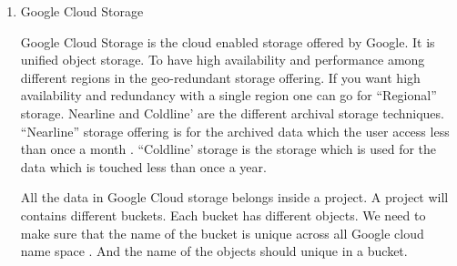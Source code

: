 \begin{enumerate}
\item {} 
Google Cloud Storage

Google Cloud Storage is the cloud enabled storage offered by
Google. \label{\detokenize{i524/technologies:id556}}{\hyperref[\detokenize{i524/technologies:www-google-cloud-storage}]{\sphinxcrossref{{[}476{]}}}} It is unified object
storage. To have high availability and performance among
different regions in the geo-redundant storage offering. If you
want high availability and redundancy with a single region one
can go for “Regional” storage. Nearline and Coldline’ are the
different archival storage techniques. “Nearline” storage
offering is for the archived data which the user access less than
once a month . “Coldline’ storage is the storage which is used
for the data which is touched less than once a year.

All the data in Google Cloud storage belongs inside a project. A
project will contains different buckets. Each bucket has
different objects. We need to make sure that the name of the
bucket is unique across all Google cloud name space . And the
name of the objects should unique in a bucket.

\end{enumerate}


